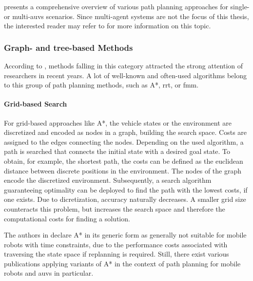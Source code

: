 \cite{Panda20} presents a comprehensive overview of various path planning approaches for single- or multi-\acsp{auv} scenarios. Since multi-agent systems are not the focus of this thesis, the interested reader may refer to \cite{Panda20} for more information on this topic.


\subsubsection{Graph- and tree-based Methods}
According to \cite{Gomez15}, methods falling in this category attracted the strong attention of researchers in recent years. 
A lot of well-known and often-used algorithms belong to this group of path planning methods, such as A*, \ac{rrt}, or \ac{fmm}.


\paragraph{Grid-based Search}
For grid-based approaches like A*, the vehicle states or the environment are discretized and encoded as nodes in a graph, building the search space. Costs are assigned to the edges connecting the nodes. Depending on the used algorithm, a path is searched that connects the initial state with a desired goal state.
To obtain, for example, the shortest path, the costs can be defined as the euclidean distance between discrete positions in the environment. The nodes of the graph encode the discretized environment.
Subsequently, a search algorithm guaranteeing optimality can be deployed to find the path with the lowest costs, if one exists. Due to dicretization, accuracy naturally decreases. A smaller grid size counteracts this problem, but increases the search space and therefore the computational costs for finding a solution.

The authors in \cite{Fernandes2015TowardsAO} declare A* in its generic form as generally not suitable for mobile robots with time constraints, due to the performance costs associated with traversing the state space if replanning is required. Still, there exist various publications applying variants of A* in the context of path planning for mobile robots and \acp{auv} in particular.

